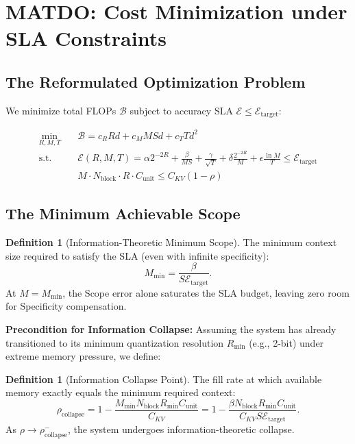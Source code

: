 \documentclass[11pt,a4paper]{article}
\theoremstyle{plain}
\theoremstyle{definition}
\newtheorem{definition}[theorem]{Definition}
\theoremstyle{remark}
\begin{document}
\section{MATDO: Cost Minimization under SLA Constraints}\label{sec:matdo}

\subsection{The Reformulated Optimization Problem}

We minimize total FLOPs $\mathcal{B}$ subject to accuracy SLA $\mathcal{E} \leq \mathcal{E}_{\text{target}}$:

\begin{align}
\min_{R,M,T} \quad & \mathcal{B} = c_R R d + c_M M S d + c_T T d^2 \label{eq:cost}\\
\text{s.t.} \quad & \mathcal{E}(R,M,T) = \alpha 2^{-2R} + \frac{\beta}{MS} + \frac{\gamma}{\sqrt{T}} + \delta \frac{2^{-2R}}{M} + \epsilon \frac{\ln M}{T} \leq \mathcal{E}_{\text{target}} \label{eq:sla}\\
& M \cdot N_{\text{block}} \cdot R \cdot C_{\text{unit}} \leq C_{KV}(1-\rho) \label{eq:kv}
\end{align}

\subsection{The Minimum Achievable Scope}

\begin{definition}[Information-Theoretic Minimum Scope]\label{def:mmin}
The minimum context size required to satisfy the SLA (even with infinite specificity):
\begin{equation}
    M_{\min} = \frac{\beta}{S \mathcal{E}_{\text{target}}}.
\end{equation}
At $M = M_{\min}$, the Scope error alone saturates the SLA budget, leaving zero room for Specificity compensation.
\end{definition}

\textbf{Precondition for Information Collapse:} Assuming the system has already transitioned to its minimum quantization resolution $R_{\min}$ (e.g., 2-bit) under extreme memory pressure, we define:

\begin{definition}[Information Collapse Point]\label{def:rho_collapse}
The fill rate at which available memory exactly equals the minimum required context:
\begin{equation}
    \rho_{\text{collapse}} = 1 - \frac{M_{\min} N_{\text{block}} R_{\min} C_{\text{unit}}}{C_{KV}} = 1 - \frac{\beta N_{\text{block}} R_{\min} C_{\text{unit}}}{C_{KV} S \mathcal{E}_{\text{target}}}.
\end{equation}
As $\rho \to \rho_{\text{collapse}}^-$, the system undergoes information-theoretic collapse.
\end{definition}
\end{document}
